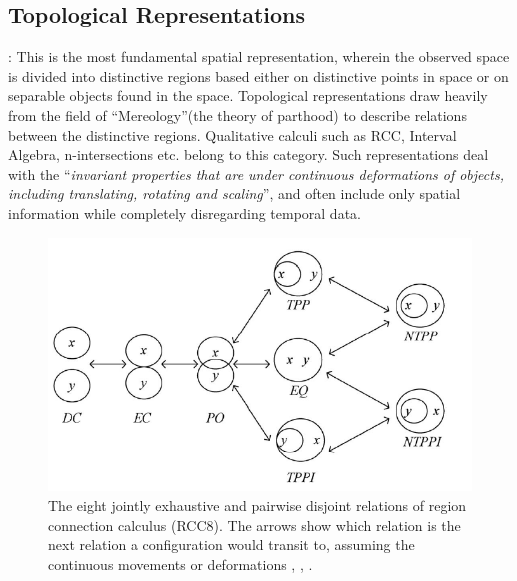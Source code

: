 		
		
		\subsection{Topological Representations} \cite{} \cite{bibid} \cite{bibid} : This is the most fundamental spatial representation, wherein the observed space is divided into distinctive regions based either on distinctive points in space or on separable objects found in the space. Topological representations draw heavily from the field of ``Mereology''(the theory of parthood) to describe relations between the distinctive regions. Qualitative calculi such as RCC, Interval Algebra, n-intersections etc. belong to this category. Such representations deal with the ``\textit{invariant properties that are under continuous deformations of objects, including translating, rotating and scaling}'', and often include only spatial information while completely disregarding temporal data. 
		
		\begin{figure}[h]
			\centering
			\includegraphics[width=0.7\linewidth]{images/rcc8_rel}
			\caption{The eight jointly exhaustive and pairwise disjoint relations of region connection calculus (RCC8). The arrows show which relation is the next relation a configuration would transit to, assuming the continuous movements or deformations \cite{bibid}, \cite{bibid}, \cite{bibid}.}
			\label{fig:rcc8rel}
		\end{figure}
		
		
